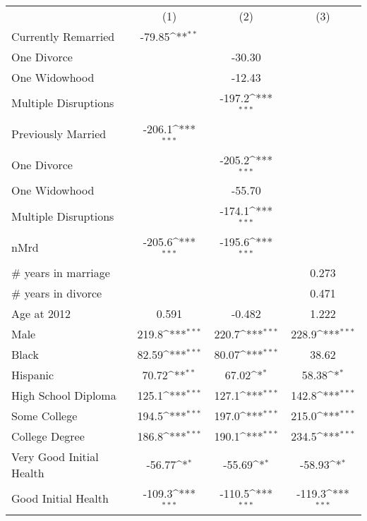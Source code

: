 {
\def\sym#1{\ifmmode^{#1}\else\(^{#1}\)\fi}
\begin{tabular}{l*{3}{c}}
                &\multicolumn{1}{c}{(1)}         &\multicolumn{1}{c}{(2)}         &\multicolumn{1}{c}{(3)}         \\
Currently Remarried&   -79.85\sym{**} &                  &                  \\
One Divorce     &                  &   -30.30         &                  \\
One Widowhood   &                  &   -12.43         &                  \\
Multiple Disruptions&                  &   -197.2\sym{***}&                  \\
Previously Married&   -206.1\sym{***}&                  &                  \\
One Divorce     &                  &   -205.2\sym{***}&                  \\
One Widowhood   &                  &   -55.70         &                  \\
Multiple Disruptions&                  &   -174.1\sym{***}&                  \\
nMrd            &   -205.6\sym{***}&   -195.6\sym{***}&                  \\
# years in marriage&                  &                  &    0.273         \\
# years in divorce&                  &                  &    0.471         \\
Age at 2012     &    0.591         &   -0.482         &    1.222         \\
Male            &    219.8\sym{***}&    220.7\sym{***}&    228.9\sym{***}\\
Black           &    82.59\sym{***}&    80.07\sym{***}&    38.62         \\
Hispanic        &    70.72\sym{**} &    67.02\sym{*}  &    58.38\sym{*}  \\
High School Diploma&    125.1\sym{***}&    127.1\sym{***}&    142.8\sym{***}\\
Some College    &    194.5\sym{***}&    197.0\sym{***}&    215.0\sym{***}\\
College Degree  &    186.8\sym{***}&    190.1\sym{***}&    234.5\sym{***}\\
Very Good Initial Health&   -56.77\sym{*}  &   -55.69\sym{*}  &   -58.93\sym{*}  \\
Good Initial Health&   -109.3\sym{***}&   -110.5\sym{***}&   -119.3\sym{***}\\

\end{tabular}}
